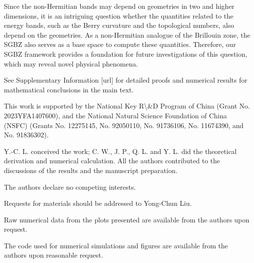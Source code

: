\documentclass[pdflatex,sn-nature,iicol]{sn-jnl}
\theoremstyle{thmstyleone}%
\theoremstyle{thmstyletwo}%
\theoremstyle{thmstylethree}%
\begin{document}
Since the non-Hermitian bands may depend on geometries in two and
higher dimensions, it is an intriguing question whether the quantities
related to the energy bands, such as the Berry curvature and the topological
numbers, also depend on the geometries. As a non-Hermitian analogue
of the Brillouin zone, the SGBZ also serves as a base space to compute
these quantities. Therefore, our SGBZ framework provides a foundation
for future investigations of this question, which may reveal novel
physical phenomena.

\backmatter

See Supplementary Information [url] for detailed proofs and numerical results for mathematical conclusions in the main text.

This work is supported by the National Key R\textbackslash\&D Program
of China (Grant No. 2023YFA1407600), and the National Natural Science
Foundation of China (NSFC) (Grants No. 12275145, No. 92050110, No.
91736106, No. 11674390, and No. 91836302). 

Y.-C. L. conceived the work; C. W., J. P., Q. L. and Y. L. did the theoretical derivation and numerical calculation. All the authors contributed to the discussions of the results and the manuscript preparation.

The authors declare no competing interests.

Requests for materials should be addressed to Yong-Chun Liu.

Raw numerical data from the plots presented are available from the authors upon request.

The code used for numerical simulations and figures are available from the authors upon reasonable request.
\end{document}
